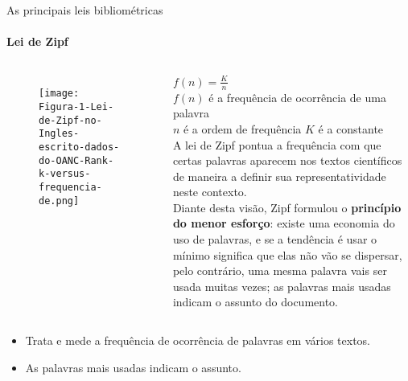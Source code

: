 \begin{frame}[t]{As principais leis bibliométricas}
    \framesubtitle{Lei de Zipf}
       
          

    \begin{columns}

        \begin{figure}
            \texttt{[image: Figura-1-Lei-de-Zipf-no-Ingles-escrito-dados-do-OANC-Rank-k-versus-frequencia-de.png]}
        \end{figure}

        \centering
        $f(n) = \frac{K}{n}$\\
        $f(n)$ \scriptsize{é a frequência de ocorrência de uma palavra}\\
        $n$ \scriptsize{é a ordem de frequência}
        $K$ \scriptsize{é a constante}\\

        A lei de Zipf pontua a frequência com que certas palavras aparecem nos textos científicos de maneira a definir sua representatividade neste contexto.\\
        \scriptsize{
            Diante desta visão, Zipf formulou o \textbf{princípio do menor esforço}: existe uma economia do uso de palavras, e se a tendência é usar o mínimo significa que elas não vão se dispersar, pelo contrário, uma mesma palavra vais ser usada muitas vezes; as palavras mais usadas indicam o assunto do documento.
        }
    \end{columns}

    \vspace*{0.2cm}
    \begin{itemize}
        \item Trata e mede a frequência de ocorrência de palavras em vários textos.
        \item As palavras mais usadas indicam o assunto.
    \end{itemize}
\end{frame}

